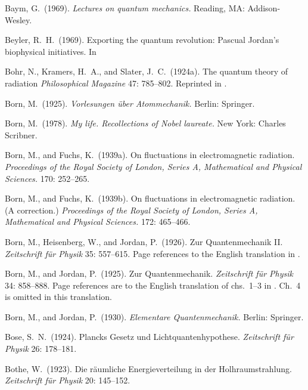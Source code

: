 \documentclass[12pt]{elsart}
\begin{document}
{\begin{thebibliography}{}
 Baym, G.\ (1969). {\it Lectures on quantum mechanics.} Reading, MA: Addison-Wesley.

 Beyler, R.\ H.\  (1969). Exporting the quantum revolution: Pascual Jordan's biophysical initiatives. In \citep[pp.\ 69--81]{Hoffmann 2007}

 Bohr, N., Kramers, H.\ A., and Slater, J.\ C.\  (1924a). The quantum theory of radiation {\it Philosophical Magazine} 47: 785--802. Reprinted in \citep[pp.\ 159--176]{Van der Waerden}.

 Born, M.\ (1925). {\it Vorlesungen \"{u}ber Atommechanik.} Berlin: Springer.

 Born, M.\ (1978). {\it My life. Recollections of Nobel laureate.} New York: Charles Scribner.

 Born, M., and Fuchs, K.\ (1939a). On fluctuations in electromagnetic radiation. {\it Proceedings of the Royal Society of London, Series A, Mathematical and Physical
Sciences.} 170: 252--265.

 Born, M., and Fuchs, K.\  (1939b). On fluctuations in electromagnetic radiation. (A correction.) {\it Proceedings of the Royal Society of London, Series A, Mathematical and Physical
Sciences.} 172: 465--466.

 Born, M., Heisenberg, W., and Jordan, P.\ (1926). Zur Quantenmechanik II. {\it Zeitschrift f\"{u}r Physik}  35: 557--615. Page references to the English translation in \citep[pp.\ 321--385]{Van der Waerden}.

 Born, M., and Jordan, P.\ (1925). Zur Quantenmechanik. {\it Zeitschrift f\"{u}r Physik} 34: 858--888. Page references are to the English translation of chs.\ 1--3 in \citep[pp.\ 277--306]{Van der Waerden}. Ch.\ 4 is omitted in this translation.

 Born, M., and Jordan, P.\  (1930). {\it Elementare Quantenmechanik.} Berlin: Springer.

 Bose, S.\ N.\ (1924). Plancks Gesetz und Lichtquantenhypothese. {\it Zeitschrift f\"{u}r Physik} 26: 178--181.

 Bothe, W.\ (1923). Die r\"aumliche Energieverteilung in der Holhraumstrahlung. {\it Zeitschrift f\"ur Physik} 20: 145--152.


\end{thebibliography}}
\end{document}
